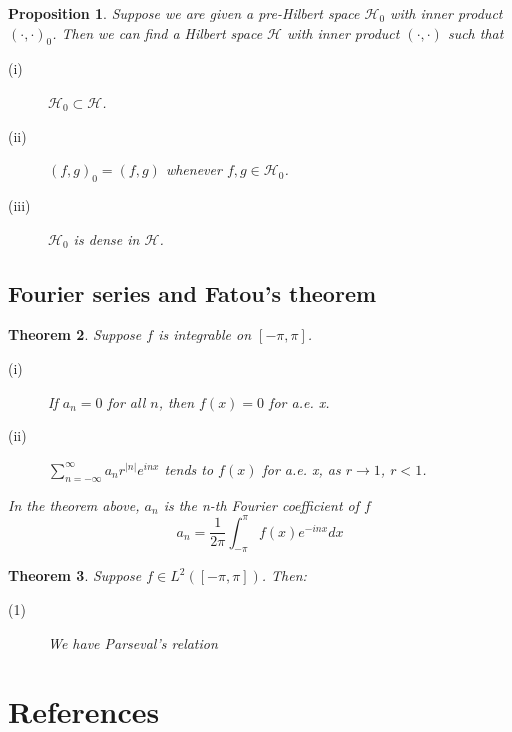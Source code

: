 \documentclass[11pt]{article}
\newtheorem{theorem}{Theorem}[subsection]
\newtheorem{proposition}[theorem]{Proposition}
\begin{document}
\begin{proposition}
    Suppose we are given a pre-Hilbert space $\mathcal{H}_0$ with inner product $(\cdot,\cdot)_0$. Then we can find a Hilbert space $\mathcal{H}$ with inner product $(\cdot,\cdot)$ such that
    \begin{description}
        \item[(i)] $\mathcal{H}_0\subset \mathcal{H}$.
        \item[(ii)] $(f,g)_0=(f,g)$ whenever $f,g\in\mathcal{H}_0$.
        \item[(iii)] $\mathcal{H}_0 $ is dense in $\mathcal{H}$.
    \end{description}
\end{proposition}

\subsection{Fourier series and Fatou's theorem}
\begin{theorem}
    Suppose $f$ is integrable on $[-\pi,\pi]$.
    \begin{description}
        \item[(i)] If $a_n=0$ for all $n$, then $f(x)=0$ for a.e. x.
        \item[(ii)] $\sum_{n=-\infty}^\infty a_nr^{|n|}e^{inx}$ tends to $f(x)$ for a.e. x, as $r\to1 $, $r<1$.
    \end{description}
    In the theorem above, $a_n$ is the n-th Fourier coefficient of $f$
    \[a_n=\frac{1}{2\pi}\int_{-\pi}^{\pi}f(x)e^{-inx}dx\]
\end{theorem}
\begin{theorem}
    Suppose $f\in L^2([-\pi,\pi])$. Then:
    \begin{description}
        \item[(1)] We have Parseval's relation
    \end{description}
\end{theorem}
\section*{References}
\end{document}
